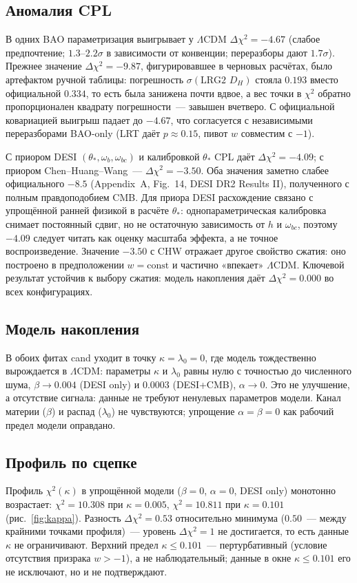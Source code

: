 \documentclass[11pt,a4paper]{article}
\begin{document}
\subsection{Аномалия CPL}
В одних BAO параметризация выигрывает у $\Lambda$CDM $\Delta\chi^2=-4.67$ (слабое предпочтение; $1.3$--$2.2\sigma$ в зависимости от конвенции; переразборы дают $1.7\sigma$). Прежнее значение $\Delta\chi^2=-9.87$, фигурировавшее в черновых расчётах, было артефактом ручной таблицы: погрешность $\sigma(\text{LRG2 }D_H)$ стояла $0.193$ вместо официальной $0.334$, то есть была занижена почти вдвое, а вес точки в $\chi^2$ обратно пропорционален квадрату погрешности~--- завышен вчетверо. С официальной ковариацией выигрыш падает до $-4.67$, что согласуется с независимыми переразборами BAO-only (LRT даёт $p\approx0.15$, пивот $w$ совместим с $-1$).

С приором DESI $(\theta_*,\omega_b,\omega_{bc})$ и калибровкой $\theta_*$ CPL даёт $\Delta\chi^2=-4.09$; с приором Chen--Huang--Wang~--- $\Delta\chi^2=-3.50$. Оба значения заметно слабее официального $-8.5$ (Appendix~A, Fig.~14, DESI DR2 Results II), полученного с полным правдоподобием CMB. Для приора DESI расхождение связано с упрощённой ранней физикой в расчёте $\theta_*$: однопараметрическая калибровка снимает постоянный сдвиг, но не остаточную зависимость от $h$ и $\omega_{bc}$, поэтому $-4.09$ следует читать как оценку масштаба эффекта, а не точное воспроизведение. Значение $-3.50$ с CHW отражает другое свойство сжатия: оно построено в предположении $w=\mathrm{const}$ и частично «впекает» $\Lambda$CDM. Ключевой результат устойчив к выбору сжатия: модель накопления даёт $\Delta\chi^2=0.000$ во всех конфигурациях.

\subsection{Модель накопления}
В обоих фитах cand уходит в точку $\kappa=\lambda_0=0$, где модель тождественно вырождается в $\Lambda$CDM: параметры $\kappa$ и $\lambda_0$ равны нулю с точностью до численного шума, $\beta\to0.004$ (DESI only) и $0.0003$ (DESI+CMB), $\alpha\to0$. Это не улучшение, а отсутствие сигнала: данные не требуют ненулевых параметров модели. Канал материи ($\beta$) и распад ($\lambda_0$) не чувствуются; упрощение $\alpha=\beta=0$ как рабочий предел модели оправдано.

\subsection{Профиль по сцепке}
Профиль $\chi^2(\kappa)$ в упрощённой модели ($\beta=0$, $\alpha=0$, DESI only) монотонно возрастает: $\chi^2=10.308$ при $\kappa=0.005$, $\chi^2=10.811$ при $\kappa=0.101$ (рис.~\ref{fig:kappa}). Разность $\Delta\chi^2=0.53$ относительно минимума ($0.50$~--- между крайними точками профиля)~--- уровень $\Delta\chi^2=1$ не достигается, то есть данные $\kappa$ не ограничивают. Верхний предел $\kappa\le0.101$~--- пертурбативный (условие отсутствия призрака $w>-1$), а не наблюдательный; данные в окне $\kappa\le0.101$ его не исключают, но и не подтверждают.
\end{document}
